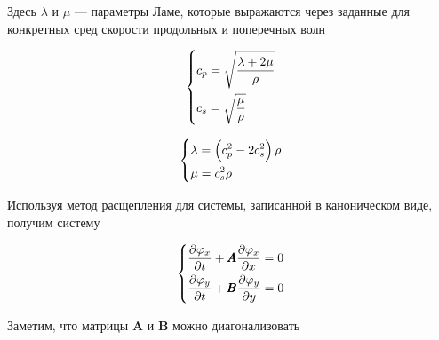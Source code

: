 Здесь $\lambda$ и $\mu$ --- параметры Ламе, которые выражаются через заданные для конкретных сред скорости продольных и поперечных волн

\begin{equation}
    \begin{dcases}
        c_p = \sqrt{\dfrac{\lambda + 2\mu}{\rho}} \\
        c_s = \sqrt{\dfrac{\mu}{\rho}}
    \end{dcases}
\end{equation}

\begin{equation}
    \begin{dcases}
        \lambda = \left(c_p^2 - 2 c_s^2\right) \rho \\
        \mu = c_s^2 \rho
    \end{dcases}
\end{equation}

Используя метод расщепления для системы, записанной в каноническом виде, получим систему

\begin{equation}
    \begin{dcases}
        \dfrac{\partial \varphi_x}{\partial t} + \pmb{A} \dfrac{\partial \varphi_x}{\partial x} = 0 \\
        \dfrac{\partial \varphi_y}{\partial t} + \pmb{B} \dfrac{\partial \varphi_y}{\partial y} = 0
    \end{dcases}
    \label{eq:rashepl_elastic}
\end{equation}

Заметим, что матрицы $\pmb{A}$ и $\pmb{B}$ можно диагонализовать

